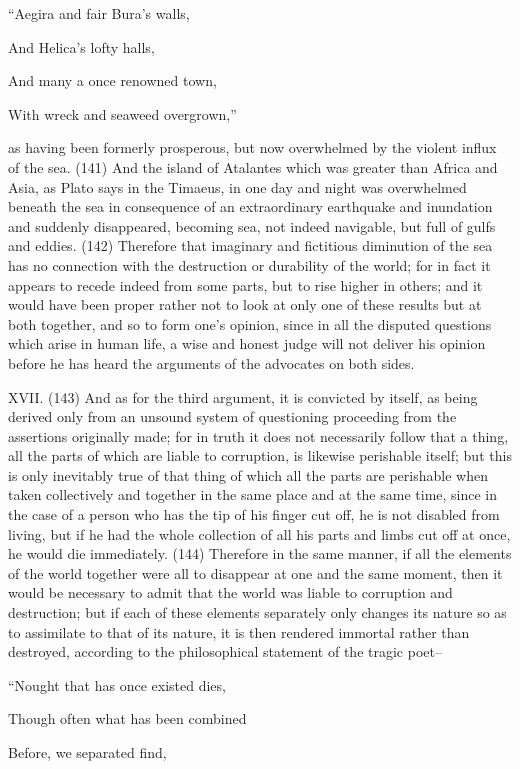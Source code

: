 ``Aegira and fair Bura's walls,

And Helica's lofty halls,

And many a once renowned town,

With wreck and seaweed overgrown,''

as having been formerly prosperous, but now overwhelmed by the violent influx of the sea. (141)
And the island of Atalantes which was greater than Africa and Asia, as Plato says in the Timaeus,
in one day and night was overwhelmed beneath the sea in consequence of an extraordinary
earthquake and inundation and suddenly disappeared, becoming sea, not indeed navigable, but full
of gulfs and eddies. (142) Therefore that imaginary and fictitious diminution of the sea has no
connection with the destruction or durability of the world; for in fact it appears to recede indeed
from some parts, but to rise higher in others; and it would have been proper rather not to look at
only one of these results but at both together, and so to form one's opinion, since in all the disputed
questions which arise in human life, a wise and honest judge will not deliver his opinion before he
has heard the arguments of the advocates on both sides.

XVII. (143) And as for the third argument, it is convicted by itself, as being derived only from an
unsound system of questioning proceeding from the assertions originally made; for in truth it does
not necessarily follow that a thing, all the parts of which are liable to corruption, is likewise
perishable itself; but this is only inevitably true of that thing of which all the parts are perishable
when taken collectively and together in the same place and at the same time, since in the case of a
person who has the tip of his finger cut off, he is not disabled from living, but if he had the whole
collection of all his parts and limbs cut off at once, he would die immediately. (144) Therefore in the
same manner, if all the elements of the world together were all to disappear at one and the same
moment, then it would be necessary to admit that the world was liable to corruption and destruction;
but if each of these elements separately only changes its nature so as to assimilate to that of its
nature, it is then rendered immortal rather than destroyed, according to the philosophical statement
of the tragic poet--

``Nought that has once existed dies,

Though often what has been combined

Before, we separated find,

